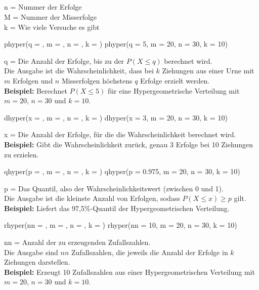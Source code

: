 \subsection{}
n = Nummer der Erfolge\\
M = Nummer der Misserfolge\\
k = Wie viele Versuche es gibt\\
\begin{rcode}{1}
phyper(q = , m = , n = , k = )
phyper(q = 5, m = 20, n = 30, k = 10)
\end{rcode}
q = Die Anzahl der Erfolge, bis zu der \(P(X \le q)\) berechnet wird.\\
Die Ausgabe ist die Wahrscheinlichkeit, dass bei \(k\) Ziehungen aus einer Urne mit \(m\) Erfolgen und \(n\) Misserfolgen höchstens \(q\) Erfolge erzielt werden.\\
\textbf{Beispiel:} Berechnet \(P(X \le 5)\) für eine Hypergeometrische Verteilung mit \(m = 20\), \(n = 30\) und \(k = 10\).\\

\begin{rcode}{1}
dhyper(x = , m = , n = , k = )
dhyper(x = 3, m = 20, n = 30, k = 10)
\end{rcode}
x = Die Anzahl der Erfolge, für die die Wahrscheinlichkeit berechnet wird.\\
\textbf{Beispiel:} Gibt die Wahrscheinlichkeit zurück, genau 3 Erfolge bei 10 Ziehungen zu erzielen.\\

\bigskip

\begin{rcode}{1}
qhyper(p = , m = , n = , k = )
qhyper(p = 0.975, m = 20, n = 30, k = 10)
\end{rcode}
p = Das Quantil, also der Wahrscheinlichkeitswert (zwischen 0 und 1).\\
Die Ausgabe ist die kleinste Anzahl von Erfolgen, sodass \(P(X \le x) \ge p\) gilt.\\
\textbf{Beispiel:} Liefert das 97,5\%-Quantil der Hypergeometrischen Verteilung.\\

\begin{rcode}{1}
rhyper(nn = , m = , n = , k = )
rhyper(nn = 10, m = 20, n = 30, k = 10)
\end{rcode}
nn = Anzahl der zu erzeugenden Zufallszahlen.\\
Die Ausgabe sind \(nn\) Zufallszahlen, die jeweils die Anzahl der Erfolge in \(k\) Ziehungen darstellen.\\
\textbf{Beispiel:} Erzeugt 10 Zufallszahlen aus einer Hypergeometrischen Verteilung mit \(m = 20\), \(n = 30\) und \(k = 10\).


